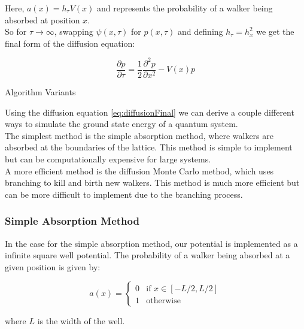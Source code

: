 \documentclass[reqno]{amsart}
\makeatletter
\renewcommand\subsection{\@startsection{subsection}{2}%
  \z@{.5\linespacing\@plus.7\linespacing}{-.5em}%
  {\normalfont\scshape\justify}}
\numberwithin{equation}{section}
\numberwithin{figure}{section}
\makeatother
\begin{document}
Here, $a(x)=h_\tau V(x)$ and represents the probability of a walker being absorbed at position $x$. \\

So for $\tau \to \infty$, swapping $\psi(x,\tau)$ for $p(x,\tau)$ and defining $h_\tau = h_x^2$ we get the final form of the diffusion equation:

\begin{equation}
    \frac{\partial p}{\partial \tau} = \frac{1}{2}\frac{\partial^2 p}{\partial x^2} - V(x)p
    \label{eq:diffusionFinal}
\end{equation}

\subsection{Algorithm Variants}

Using the diffusion equation \ref{eq:diffusionFinal} we can derive a couple different ways to simulate the ground state energy of a quantum system. \\

The simplest method is the simple absorption method, where walkers are absorbed at the boundaries of the lattice. This method is simple to implement but can be computationally expensive for large systems. \\

A more efficient method is the diffusion Monte Carlo method, which uses branching to kill and birth new walkers. This method is much more efficient but can be more difficult to implement due to the branching process.

\subsubsection{Simple Absorption Method}

In the case for the simple absorption method, our potential is implemented as a infinite square well potential. The probability of a walker being absorbed at a given position is given by:

\begin{equation}
    a(x) = \begin{cases}
        0 & \text{if } x \in [-L/2, L/2] \\
        1 & \text{otherwise}
    \end{cases}
\end{equation}

where $L$ is the width of the well. \\
\end{document}
